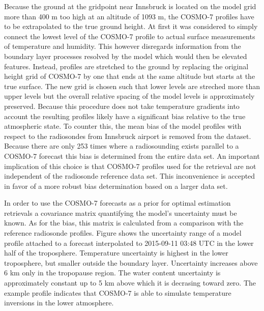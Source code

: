     Because the ground at the gridpoint near Innsbruck is located on the model
    grid more than 400 m too high at an altitude of 1093 m, the COSMO-7
    profiles have to be extrapolated to the true ground height. At first it was
    considered to simply connect the lowest level of the COSMO-7 profile to
    actual surface measurements of temperature and humidity. This however
    disregards information from the boundary layer processes resolved by the
    model which would then be elevated features. Instead, profiles are
    stretched to the ground by replacing the original height grid of COSMO-7
    by one that ends at the same altitude but starts at the true surface.
    The new grid is chosen such that lower levels are streched more than
    upper levels but the overall relative spacing of the model levels is
    approximately preserved. Because this procedure does not take temperature
    gradients into account the resulting profiles likely have a significant
    bias relative to the true atmospheric state. To counter this, the mean
    bias of the model profiles with respect to the radiosondes from Innsbruck
    airport is removed from the dataset. Because there are only 253 times
    where a radiosounding exists parallel to a COSMO-7 forecast this bias is
    determined from the entire data set. An important implication of this
    choice is that COSMO-7 profiles used for the retrieval are not independent
    of the radiosonde reference data set. This inconvenience is accepted in
    favor of a more robust bias determination based on a larger data set.

    In order to use the COSMO-7 forecasts as a prior for optimal estimation
    retrievals a covariance matrix quantifying the model's uncertainty must
    be known. As for the bias, this matrix is calculated from a comparison
    with the reference radiosonde profiles. Figure 
    shows the uncertainty range of a model profile attached to a forecast
    interpolated to 2015-09-11 03:48 UTC in the lower half of the troposphere.
    Temperature uncertainty is highest in the lower troposphere, but smaller
    outside the boundary layer. Uncertainty increases above 6 km only in the
    tropopause region. The water content uncertainty is approximately constant
    up to 5 km above which it is decrasing toward zero. The example profile
    indicates that COSMO-7 is able to simulate temperature inversions in the
    lower atmosphere.

            {}

